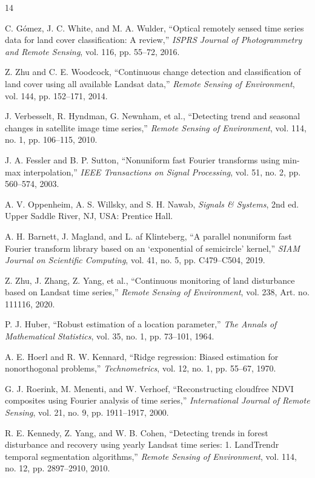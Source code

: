 \documentclass[letterpaper,journal]{IEEEtran}
\begin{document}
\begin{thebibliography}{14}


C. G\'{o}mez, J. C. White, and M. A. Wulder, ``Optical remotely sensed time series data for land cover classification: A review,'' \textit{ISPRS Journal of Photogrammetry and Remote Sensing}, vol. 116, pp. 55--72, 2016.

Z. Zhu and C. E. Woodcock, ``Continuous change detection and classification of land cover using all available Landsat data,'' \textit{Remote Sensing of Environment}, vol. 144, pp. 152--171, 2014.

J. Verbesselt, R. Hyndman, G. Newnham, et al., ``Detecting trend and seasonal changes in satellite image time series,'' \textit{Remote Sensing of Environment}, vol. 114, no. 1, pp. 106--115, 2010.

J. A. Fessler and B. P. Sutton, ``Nonuniform fast Fourier transforms using min-max interpolation,'' \textit{IEEE Transactions on Signal Processing}, vol. 51, no. 2, pp. 560--574, 2003.

A. V. Oppenheim, A. S. Willsky, and S. H. Nawab, \textit{Signals \& Systems}, 2nd ed. Upper Saddle River, NJ, USA: Prentice Hall.

A. H. Barnett, J. Magland, and L. af Klinteberg, ``A parallel nonuniform fast Fourier transform library based on an `exponential of semicircle' kernel,'' \textit{SIAM Journal on Scientific Computing}, vol. 41, no. 5, pp. C479--C504, 2019.

Z. Zhu, J. Zhang, Z. Yang, et al., ``Continuous monitoring of land disturbance based on Landsat time series,'' \textit{Remote Sensing of Environment}, vol. 238, Art. no. 111116, 2020.

P. J. Huber, ``Robust estimation of a location parameter,'' \textit{The Annals of Mathematical Statistics}, vol. 35, no. 1, pp. 73--101, 1964.

A. E. Hoerl and R. W. Kennard, ``Ridge regression: Biased estimation for nonorthogonal problems,'' \textit{Technometrics}, vol. 12, no. 1, pp. 55--67, 1970.

G. J. Roerink, M. Menenti, and W. Verhoef, ``Reconstructing cloudfree NDVI composites using Fourier analysis of time series,'' \textit{International Journal of Remote Sensing}, vol. 21, no. 9, pp. 1911--1917, 2000.

R. E. Kennedy, Z. Yang, and W. B. Cohen, ``Detecting trends in forest disturbance and recovery using yearly Landsat time series: 1. LandTrendr temporal segmentation algorithms,'' \textit{Remote Sensing of Environment}, vol. 114, no. 12, pp. 2897--2910, 2010.


\end{thebibliography}
\end{document}
